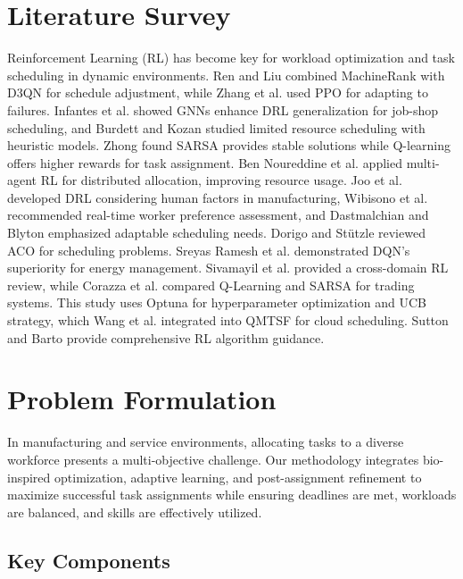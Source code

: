 \documentclass[12pt]{article}
\begin{document}
	\section{\label{sec:lit}Literature Survey}
	Reinforcement Learning (RL) has become key for workload optimization and task scheduling in dynamic environments. Ren and Liu \cite{li2024} combined MachineRank with D3QN for schedule adjustment, while Zhang et al. \cite{zhang2022} used PPO for adapting to failures. Infantes et al. \cite{infantes2024} showed GNNs enhance DRL generalization for job-shop scheduling, and Burdett and Kozan \cite{burdett2004} studied limited resource scheduling with heuristic models.
	Zhong \cite{zhong2024} found SARSA provides stable solutions while Q-learning offers higher rewards for task assignment. Ben Noureddine et al. \cite{noureddine2017} applied multi-agent RL for distributed allocation, improving resource usage. Joo et al. \cite{joo2022} developed DRL considering human factors in manufacturing, Wibisono et al. \cite{wibisono2016} recommended real-time worker preference assessment, and Dastmalchian and Blyton \cite{dastmalchian2001} emphasized adaptable scheduling needs.
	Dorigo and Stützle \cite{dorigo2016} reviewed ACO for scheduling problems. Sreyas Ramesh et al. \cite{turn0file0} demonstrated DQN's superiority for energy management. Sivamayil et al. \cite{turn0file1} provided a cross-domain RL review, while Corazza et al. \cite{Corazza2015} compared Q-Learning and SARSA for trading systems.
	This study uses Optuna \cite{Akiba2019Optuna} for hyperparameter optimization and UCB strategy, which Wang et al. \cite{Wang2023TaskScheduling} integrated into QMTSF for cloud scheduling. Sutton and Barto \cite{SuttonBarto1998} provide comprehensive RL algorithm guidance.
	
	\section{\label{sec:problem}Problem Formulation}
	
	In manufacturing and service environments, allocating tasks to a diverse workforce presents a multi-objective challenge. Our methodology integrates bio-inspired optimization, adaptive learning, and post-assignment refinement to maximize successful task assignments while ensuring deadlines are met, workloads are balanced, and skills are effectively utilized.
	
	\subsection{\label{subsec:components}Key Components}
	
\end{document}
